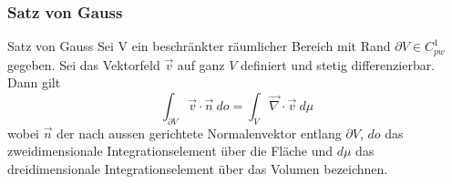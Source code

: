 \subsubsection{Satz von Gauss}

\begin{Satz}{Satz von Gauss}{}
	Sei V ein beschränkter räumlicher Bereich mit Rand $\partial V \in C^1_{pw}$ gegeben. Sei das Vektorfeld $\vec v$ auf ganz $V$ definiert und stetig differenzierbar. Dann gilt
	\[
		\int_{\partial V} \vec v \cdot \vec n\ do = \int_V \vec \nabla \cdot \vec v\ d \mu
	\]
	wobei $\vec n$ der nach aussen gerichtete Normalenvektor entlang $\partial V$, $do$ das zweidimensionale Integrationselement über die Fläche und $d\mu$ das dreidimensionale Integrationselement über das Volumen bezeichnen.
\end{Satz}


